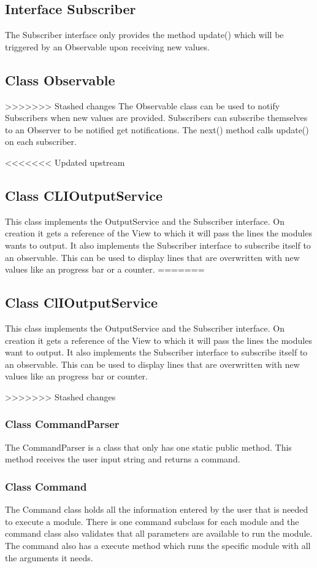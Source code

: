 \documentclass[parskip=full]{scrartcl}
\begin{document}
 \subsection{Interface Subscriber}
The Subscriber interface only provides the method update() which will be triggered by an Observable upon receiving new values.

\subsection{Class Observable} 
>>>>>>> Stashed changes
The Observable class can be used to notify Subscribers when new values are provided.
Subscribers can subscribe themselves to an Observer to be notified get notifications.
The next() method calls update() on each subscriber.

<<<<<<< Updated upstream
\subsection{Class CLIOutputService}
This class implements the OutputService and the Subscriber interface. 
On creation it gets a reference of the View to which it will pass the lines the modules wants to output.
It also implements the Subscriber interface to subscribe itself to an observable.
This can be used to display lines that are overwritten with new values like an progress bar or a counter.
=======
\subsection{Class ClIOutputService}
This class implements the OutputService and the Subscriber interface. 
On creation it gets a reference of the View to which it will pass the lines the modules want to output.
It also implements the Subscriber interface to subscribe itself to an observable.
This can be used to display lines that are overwritten with new values like an progress bar or counter.

>>>>>>> Stashed changes

\subsubsection{Class CommandParser}
The CommandParser is a class that only has one static public method.
This method receives the user input string and returns a command.

\subsubsection{Class Command}
The Command class holds all the information entered by the user that is needed to execute a module.
There is one command subclass for each module and the command class also validates that all parameters are available to run the module.
The command also has a execute method which runs the specific module with all the arguments it needs.
\end{document}
